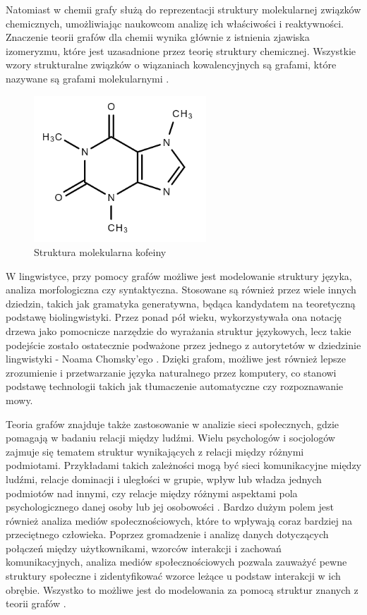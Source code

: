 Natomiast w chemii grafy służą do reprezentacji struktury molekularnej związków chemicznych,
umożliwiając naukowcom analizę ich właściwości i reaktywności.
Znaczenie teorii grafów dla chemii wynika głównie z istnienia zjawiska izomeryzmu,
które jest uzasadnione przez teorię struktury chemicznej.
Wszystkie wzory strukturalne związków o wiązaniach kowalencyjnych są grafami,
które nazywane są grafami molekularnymi \cite{Balaban1985}.

\begin{figure}[ht]
	\centering
	\includegraphics[height=5.5cm]{resources/introduction/images/chem.png}
	\caption{Struktura molekularna kofeiny}
    \label{Fig:intro-4}
\end{figure}

W lingwistyce, przy pomocy grafów możliwe jest modelowanie struktury języka, analiza morfologiczna czy syntaktyczna.
Stosowane są również przez wiele innych dziedzin, takich jak gramatyka generatywna,
będąca kandydatem na teoretyczną podstawę biolingwistyki.
Przez ponad pół wieku, wykorzystywała ona notację drzewa jako pomocnicze narzędzie do wyrażania struktur językowych,
lecz takie podejście zostało ostatecznie podważone przez jednego z autorytetów w dziedzinie lingwistyki - Noama Chomsky'ego \cite{Arikawa2019}.
Dzięki grafom, możliwe jest również lepsze zrozumienie i przetwarzanie języka naturalnego przez komputery,
co stanowi podstawę technologii takich jak tłumaczenie automatyczne czy rozpoznawanie mowy.

Teoria grafów znajduje także zastosowanie w analizie sieci społecznych, gdzie pomagają w badaniu relacji między ludźmi.
Wielu psychologów i socjologów zajmuje się tematem struktur wynikających z relacji między różnymi podmiotami.
Przykładami takich zależności mogą być sieci komunikacyjne między ludźmi, relacje dominacji i uległości w grupie,
wpływ lub władza jednych podmiotów nad innymi, czy relacje między różnymi aspektami pola psychologicznego danej osoby lub jej osobowości \cite{Harary1953}.
Bardzo dużym polem jest również analiza mediów społecznościowych, które to wpływają coraz bardziej na przeciętnego człowieka.
Poprzez gromadzenie i analizę danych dotyczących połączeń między użytkownikami, wzorców interakcji i zachowań komunikacyjnych,
analiza mediów społecznościowych pozwala zauważyć pewne struktury społeczne i zidentyfikować wzorce leżące u podstaw interakcji w ich obrębie.
Wszystko to możliwe jest do modelowania za pomocą struktur znanych z teorii grafów \cite{Umami2024}.

